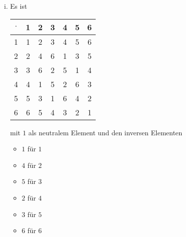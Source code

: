 \documentclass{scrreprt}
\begin{document}
\begin{enumerate}[(i)]

\item Es ist

  \begin{tabular}{|c|cccccc|}
    \hline
    $\cdot$ & 1 & 2 & 3 & 4 & 5 & 6 \\
    \hline
    1 & 1 & 2 & 3 & 4 & 5 & 6 \\
    2 & 2 & 4 & 6 & 1 & 3 & 5 \\
    3 & 3 & 6 & 2 & 5 & 1 & 4 \\
    4 & 4 & 1 & 5 & 2 & 6 & 3 \\
    5 & 5 & 3 & 1 & 6 & 4 & 2 \\
    6 & 6 & 5 & 4 & 3 & 2 & 1 \\
    \hline
  \end{tabular}

  mit $1$ als neutralem Element und den inversen Elementen
  \begin{itemize}
  \item $1$ für $1$
  \item $4$ für $2$
  \item $5$ für $3$
  \item $2$ für $4$
  \item $3$ für $5$
  \item $6$ für $6$
  \end{itemize}
\end{enumerate}
\end{document}
